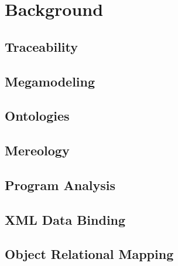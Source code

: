 \chapter{Background}
\lipsum[1]

\section{Traceability}
\lipsum[1]

\section{Megamodeling}
\lipsum[1]

\section{Ontologies}
\lipsum[1]

\section{Mereology}
\lipsum[1]

\section{Program Analysis}
\lipsum[1]

\section{XML Data Binding}
\lipsum[1]

\section{Object Relational Mapping}
\lipsum[1]
